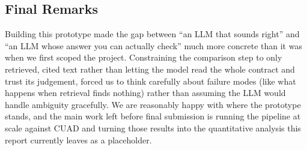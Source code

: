 \documentclass[11pt]{article}
\begin{document}
\subsection{Final Remarks}

Building this prototype made the gap between ``an LLM that sounds
right'' and ``an LLM whose answer you can actually check'' much more
concrete than it was when we first scoped the project. Constraining
the comparison step to only retrieved, cited text rather than
letting the model read the whole contract and trust its judgement, forced us to think carefully about failure modes (like what happens
when retrieval finds nothing) rather than assuming the LLM would
handle ambiguity gracefully. We are reasonably happy with where the
prototype stands, and the main work left before final submission is
running the pipeline at scale against CUAD and turning those results
into the quantitative analysis this report currently leaves as a
placeholder.
\end{document}
